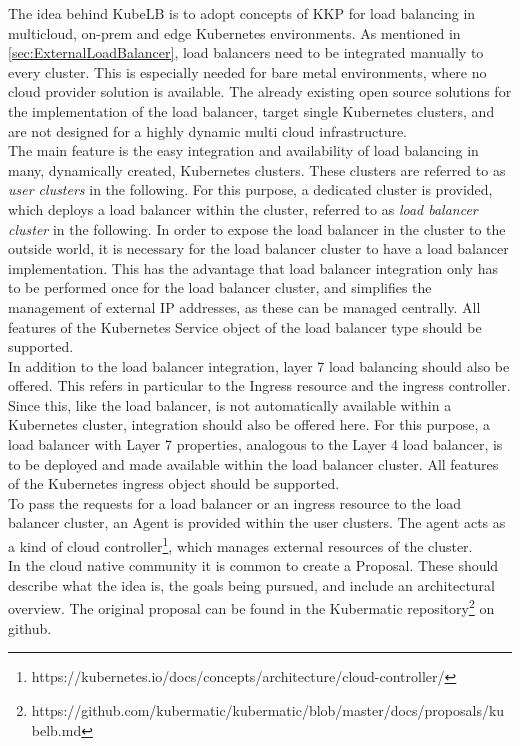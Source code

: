 The idea behind KubeLB is to adopt concepts of KKP for load balancing in multicloud, on-prem and edge Kubernetes environments.
As mentioned in \autoref{sec:ExternalLoadBalancer}, load balancers need to be integrated manually to every cluster.
This is especially needed for bare metal environments, where no cloud provider solution is available.
The already existing open source solutions for the implementation of the load balancer, target single Kubernetes clusters, and are not designed for a highly dynamic multi cloud infrastructure.
\\
The main feature is the easy integration and availability of load balancing in many, dynamically created, Kubernetes clusters.
These clusters are referred to as \textit{user clusters} in the following.
For this purpose, a dedicated cluster is provided, which deploys a load balancer within the cluster, referred to as \textit{load balancer cluster} in the following.
In order to expose the load balancer in the cluster to the outside world, it is necessary for the load balancer cluster to have a load balancer implementation.
This has the advantage that load balancer integration only has to be performed once for the load balancer cluster, and simplifies the management of external IP addresses, as these can be managed centrally.
All features of the Kubernetes Service object of the load balancer type should be supported.
\\
In addition to the load balancer integration, layer 7 load balancing should also be offered.
This refers in particular to the Ingress resource and the ingress controller.
Since this, like the load balancer, is not automatically available within a Kubernetes cluster, integration should also be offered here.
For this purpose, a load balancer with Layer 7 properties, analogous to the Layer 4 load balancer, is to be deployed and made available within the load balancer cluster.
All features of the Kubernetes ingress object should be supported.
\\
To pass the requests for a load balancer or an ingress resource to the load balancer cluster, an Agent is provided within the user clusters.
The agent acts as a kind of cloud controller\footnote{https://kubernetes.io/docs/concepts/architecture/cloud-controller/}, which manages external resources of the cluster.
\\
In the cloud native community it is common to create a Proposal.
These should describe what the idea is, the goals being pursued, and include an architectural overview.
The original proposal can be found in the Kubermatic repository\footnote{https://github.com/kubermatic/kubermatic/blob/master/docs/proposals/kubelb.md} on github.
